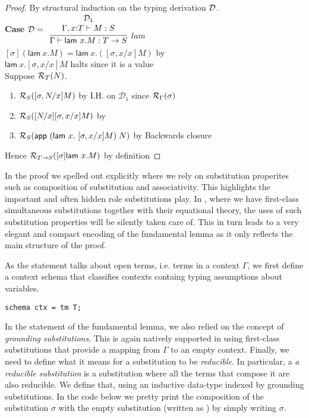 \begin{proof} By structural induction on the typing derivation ${\mathcal{D}}$.
\\[0.5em]
\noindent
\textbf{Case}  ${\mathcal{D}}=\begin{array}{l}\infer[lam]{\Gamma \vdash \mathsf{lam}~ x.M : T \arrow
    S}{
    \begin{array}{c}
      {\mathcal{D}}_1\\
      \Gamma,x{:}T \vdash M : S
    \end{array}
}\end{array}$
\\[0.5em]
$[\sigma](\mathsf{lam}~x.M) = \mathsf{lam}~ x.([\sigma,x/x]M)$ \hfill 
by  \\
$\mathsf{lam}~ x.[\sigma,x/x]M$ halts \hfill since it is a value\\
Suppose $\mathcal{R}_{T}(N)$.
\begin{enumerate}
\item $\mathcal{R}_{S}([\sigma,N/x]M)$ \hfill by I.H. on ${\mathcal{D}}_1$ since $\mathcal{R}_{\Gamma}(\sigma)$
\item $\mathcal{R}_{S}([N/x][\sigma,x/x]M)$ \hfill by 
\item $\mathcal{R}_{S}(\mathsf{app}~(\mathsf{lam}~ x.~[\sigma,x/x]M)\; N)$ \hfill by Backwards closure
\end{enumerate}
Hence $\mathcal{R}_{T \rightarrow S}([\sigma]\mathsf{lam}~ x.M)$ \hfill by definition

\end{proof}

In the proof we spelled out explicitly where we rely on substitution properites
such as composition of substitution and associativity. This highlights
the important and often hidden role substitutions play. In \beluga,
where we have first-class simultaneous substitutions together with their
equational theory, the uses of such substitution properties will be
silently taken care of. This in turn leads to a very elegant and
compact encoding of the fundamental lemma as it only reflects the main
structure of the proof.

As the statement talks about open terms, i.e. terms in a context
$\Gamma$, we first define a context schema that classifies contexts
containg typing assumptions about variables. 

\begin{lstlisting}
schema ctx = tm T;
\end{lstlisting}

In the statement of the fundamental lemma, we also relied on the
concept of \emph{grounding substitutions}. This is again  
natively supported in \beluga using first-class substitutions that
provide a mapping from $\Gamma$ to an empty context. Finally,  we need to define what it means for a
substitution to be \emph{reducible}. In particular, a \emph{a
  reducible substitution} is a substitution where all the terms that
compose it are also reducible. We define that, using an inductive
data-type indexed by grounding substitutions. In the code below we
pretty print the composition of the substitution $\sigma$ with the
empty substitution (written as \bel{^}) by simply writing $\sigma$. 

